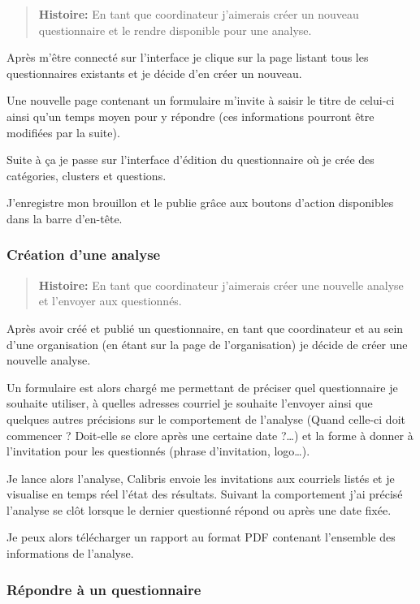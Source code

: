 \documentclass[12pt,a4paper]{book}
\begin{document}
\begin{quote}
  \textbf{Histoire:} En tant que coordinateur j'aimerais créer un nouveau questionnaire et le rendre disponible pour une analyse.
\end{quote}

Après m'être connecté sur l'interface je clique sur la page listant tous les questionnaires existants et je décide d'en créer un nouveau.

Une nouvelle page contenant un formulaire m'invite à saisir le titre de celui-ci ainsi qu'un temps moyen pour y répondre (ces informations pourront être modifiées par la suite).

Suite à ça je passe sur l'interface d'édition du questionnaire où je crée des catégories, clusters et questions. 

J'enregistre mon brouillon et le publie grâce aux boutons d'action disponibles dans la barre d'en-tête.

\subsubsection{Création d'une analyse}

\begin{quote}
  \textbf{Histoire:} En tant que coordinateur j'aimerais créer une nouvelle analyse et l'envoyer aux questionnés.
\end{quote}

Après avoir créé et publié un questionnaire, en tant que coordinateur et au sein d'une organisation (en étant sur la page de l'organisation) je décide de créer une nouvelle analyse.

Un formulaire est alors chargé me permettant de préciser quel questionnaire je souhaite utiliser, à quelles adresses courriel je souhaite l'envoyer ainsi que quelques autres précisions sur le comportement de l'analyse (Quand celle-ci doit commencer ? Doit-elle se clore après une certaine date ?…) et la forme à donner à l'invitation pour les questionnés (phrase d'invitation, logo…).

Je lance alors l'analyse, Calibris envoie les invitations aux courriels listés et je visualise en temps réel l'état des résultats. Suivant la comportement j'ai précisé l'analyse se clôt lorsque le dernier questionné répond ou après une date fixée.

Je peux alors télécharger un rapport au format PDF contenant l'ensemble des informations de l'analyse.

\subsubsection{Répondre à un questionnaire}
\end{document}
